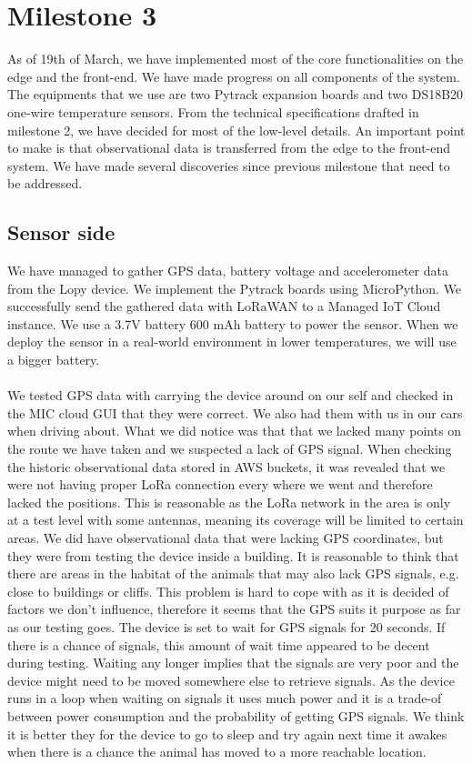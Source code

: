 \section{Milestone 3}
	As of 19th of March, we have implemented most of the core functionalities on the edge and the front-end. We have made progress on all components of the system. The equipments that we use are two Pytrack expansion boards and two DS18B20 one-wire temperature sensors. From the technical specifications drafted in milestone 2, we have decided for most of the low-level details. An important point to make is that observational data is transferred from the edge to the front-end system. We have made several discoveries since previous milestone that need to be addressed.
 

	\subsection{Sensor side}
		We have managed to gather GPS data, battery voltage and accelerometer data from the Lopy device. We implement the Pytrack boards using MicroPython. We successfully send the gathered data with LoRaWAN to a Managed IoT Cloud instance. We use a 3.7V battery 600 mAh battery to power the sensor. When we deploy the sensor in a real-world environment in lower temperatures, we will use a bigger battery. \\\\
		We tested GPS data with carrying the device around on our self and checked in the MIC cloud GUI that they were correct. We also had them with us in our cars when driving about. What we did notice was that that we lacked many points on the route we have taken and we suspected a lack of GPS signal. When checking the historic observational data stored in AWS buckets, it was revealed that we were not having proper LoRa connection every where we went and therefore lacked the positions. This is reasonable as the LoRa network in the area is only at a test level with some antennas, meaning its coverage will be limited to certain areas. We did have observational data that were lacking GPS coordinates, but they were from testing the device inside a building. It is reasonable to think that there are areas in the habitat of the animals that may also lack GPS signals, e.g. close to buildings or cliffs. This problem is hard to cope with as it is decided of factors we don't influence, therefore it seems that the GPS suits it purpose as far as our testing goes. The device is set to wait for GPS signals for 20 seconds. If there is a chance of signals, this amount of wait time appeared to be decent during testing. Waiting any longer implies that the signals are very poor and the device might need to be moved somewhere else to retrieve signals. As the device runs in a loop when waiting on signals it uses much power and it is a trade-of between power consumption and the probability of getting GPS signals. We think it is better they for the device to go to sleep and try again next time it awakes when there is a chance the animal has moved to a more reachable location. \\\\  
